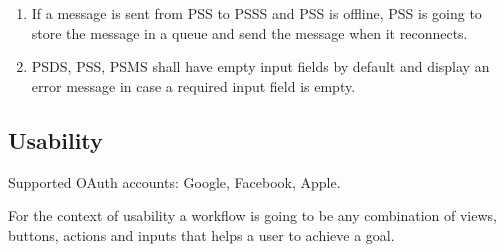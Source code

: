 \pagebreak
\begin{enumerate}[resume, label=ROB-\arabic*]
    \item If a message is sent from PSS to PSSS and PSS is offline, PSS is 
    going to store the message in a queue and send the message 
    when it reconnects.
    \item PSDS, PSS, PSMS shall have empty input fields by default and display 
    an error message in case a required input field is empty.
\end{enumerate}



\subsection{Usability}
Supported OAuth accounts: Google, Facebook, Apple. \newline
 
\noindent For the context of usability a workflow is going to be any combination of 
views, buttons, actions and inputs that helps a user to achieve a goal.

